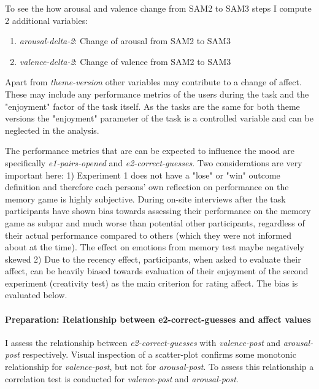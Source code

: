 	To see the how arousal and valence change from SAM2 to SAM3 steps I compute 2 additional variables:
	
	\begin{enumerate}
		\item \textit{arousal-delta-2}: Change of arousal from SAM2 to SAM3
		\item \textit{valence-delta-2}: Change of valence from SAM2 to SAM3
	\end{enumerate}
	
	Apart from \textit{theme-version} other variables may contribute to a change of affect. These may include any performance metrics of the users during the task and the "enjoyment" factor of the task itself. As the tasks are the same for both theme versions the "enjoyment" parameter of the task is a controlled variable and can be neglected in the analysis.
	
	The performance metrics that are can be expected to influence the mood are specifically \textit{e1-pairs-opened} and \textit{e2-correct-guesses}. Two considerations are very important here: 1) Experiment 1 does not have a "lose" or "win" outcome definition and therefore each persons' own reflection on performance on the memory game is highly subjective. During on-site interviews after the task participants have shown bias towards assessing their performance on the memory game as subpar and much worse than potential other participants, regardless of their actual performance compared to others (which they were not informed about at the time). The effect on emotions from memory test maybe negatively skewed 2) Due to the recency effect, participants, when asked to evaluate their affect, can be heavily biased towards evaluation of their enjoyment of the second experiment (creativity test) as the main criterion for rating affect. The bias is evaluated below.
	
	\paragraph{Preparation: Relationship between e2-correct-guesses and affect values} 
	I assess the relationship between \textit{e2-correct-guesses} with \textit{valence-post} and \textit{arousal-post} respectively. 
	Visual inspection of a scatter-plot confirms some monotonic relationship for \textit{valence-post}, but not for \textit{arousal-post}.
	To assess this relationship a correlation test is conducted for \textit{valence-post} and \textit{arousal-post}.
	
